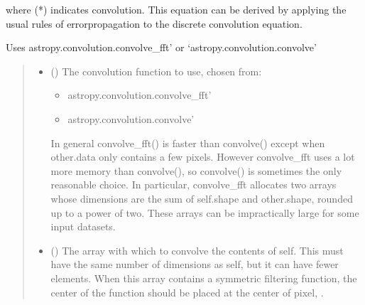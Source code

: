 \documentclass[letterpaper,10pt,english]{sphinxmanual}
\begin{document}
\begin{fulllineitems}
\begin{fulllineitems}
\sphinxAtStartPar
where (*) indicates convolution. This equation can be derived
by applying the usual rules of error\sphinxhyphen{}propagation to the
discrete convolution equation.

\sphinxAtStartPar
Uses {\color{red}\bfseries{}\textasciigrave{}}astropy.convolution.convolve\_fft’ or ‘astropy.convolution.convolve’
\begin{quote}\begin{description}
\begin{itemize}
\item {} 
\sphinxAtStartPar
{} () \textendash{} 
\sphinxAtStartPar
The convolution function to use, chosen from:
\begin{itemize}
\item {} 
\sphinxAtStartPar
{\color{red}\bfseries{}\textasciigrave{}}astropy.convolution.convolve\_fft’

\item {} 
\sphinxAtStartPar
{\color{red}\bfseries{}\textasciigrave{}}astropy.convolution.convolve’

\end{itemize}

\sphinxAtStartPar
In general convolve\_fft() is faster than convolve() except when
other.data only contains a few pixels. However convolve\_fft uses
a lot more memory than convolve(), so convolve() is sometimes the
only reasonable choice. In particular, convolve\_fft allocates two
arrays whose dimensions are the sum of self.shape and other.shape,
rounded up to a power of two. These arrays can be impractically
large for some input data\sphinxhyphen{}sets.


\item {} 
\sphinxAtStartPar
{} () \textendash{} 
\sphinxAtStartPar
The array with which to convolve the contents of self.  This must
have the same number of dimensions as self, but it can have fewer
elements. When this array contains a symmetric filtering function,
the center of the function should be placed at the center of pixel,
.


\end{itemize}
\end{description}
\end{quote}
\end{fulllineitems}
\end{fulllineitems}
\end{document}
